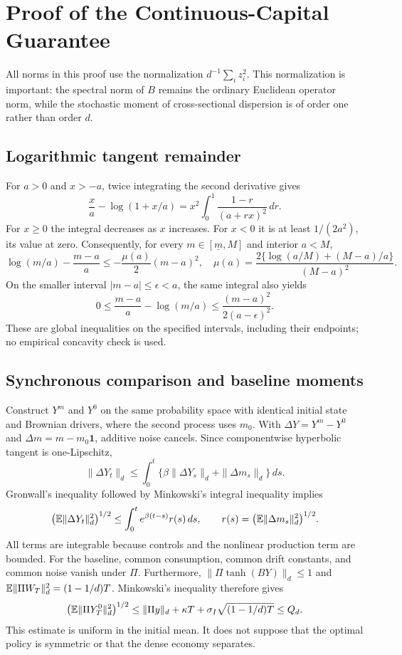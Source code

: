 \section{Proof of the Continuous-Capital Guarantee}\label{app:r10proof}
All norms in this proof use the normalization $d^{-1}\sum_i z_i^2$. This normalization is important: the spectral norm of $B$ remains the ordinary Euclidean operator norm, while the stochastic moment of cross-sectional dispersion is of order one rather than order $d$.

\subsection{Logarithmic tangent remainder}
For $a>0$ and $x>-a$, twice integrating the second derivative gives
\[
 \frac{x}{a}-\log(1+x/a)
 =x^2\int_0^1\frac{1-r}{(a+rx)^2}\,dr.
\]
For $x\geq0$ the integral decreases as $x$ increases. For $x<0$ it is at least $1/(2a^2)$, its value at zero. Consequently, for every $m\in[\underline m,M]$ and interior $a<M$,
\begin{equation}\label{eq:r10loglemma}
 \log(m/a)-\frac{m-a}{a}
 \leq-\frac{\mu(a)}2(m-a)^2,
 \quad
 \mu(a)=\frac{2\{\log(a/M)+(M-a)/a\}}{(M-a)^2}.
\end{equation}
On the smaller interval $|m-a|\leq\epsilon<a$, the same integral also yields
\begin{equation}\label{eq:r10logupper}
 0\leq\frac{m-a}{a}-\log(m/a)
 \leq\frac{(m-a)^2}{2(a-\epsilon)^2}.
\end{equation}
These are global inequalities on the specified intervals, including their endpoints; no empirical concavity check is used.

\subsection{Synchronous comparison and baseline moments}
Construct $Y^m$ and $Y^0$ on the same probability space with identical initial state and Brownian drivers, where the second process uses $m_0$. With $\Delta Y=Y^m-Y^0$ and $\Delta m=m-m_0\bm1$, additive noise cancels. Since componentwise hyperbolic tangent is one-Lipschitz,
\[
 \|\Delta Y_t\|_d\leq\int_0^t
       \{\beta\|\Delta Y_s\|_d+\|\Delta m_s\|_d\}\,ds.
\]
Gronwall's inequality followed by Minkowski's integral inequality implies
\begin{equation}\label{eq:r10stability}
 \bigl(\mathbb E\|\Delta Y_t\|_d^2\bigr)^{1/2}
 \leq\int_0^t e^{\beta(t-s)}r(s)\,ds,
 \qquad r(s)=\bigl(\mathbb E\|\Delta m_s\|_d^2\bigr)^{1/2}.
\end{equation}
All terms are integrable because controls and the nonlinear production term are bounded. For the baseline, common consumption, common drift constants, and common noise vanish under $\Pi$. Furthermore, $\|\Pi\tanh(BY)\|_d\leq1$ and
$\mathbb E\|\Pi W_T\|_d^2=(1-1/d)T$. Minkowski's inequality therefore gives
\begin{equation}\label{eq:r10moment}
 \bigl(\mathbb E\|\Pi Y_T^0\|_d^2\bigr)^{1/2}
 \leq\|\Pi y\|_d+\kappa T+\sigma_I\sqrt{(1-1/d)T}
 \leq Q_d.
\end{equation}
This estimate is uniform in the initial mean. It does not suppose that the optimal policy is symmetric or that the dense economy separates.

